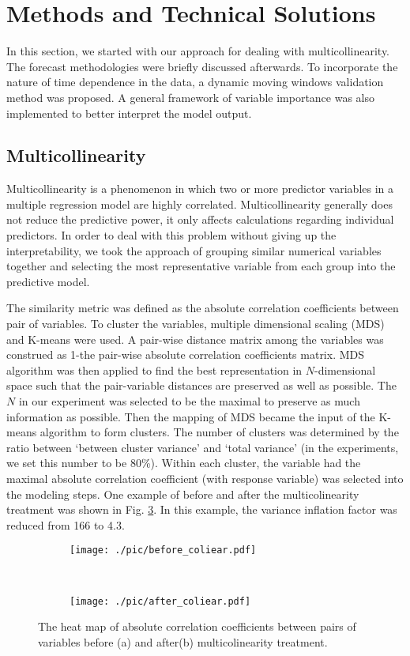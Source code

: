 \documentclass{llncs}
\begin{document}
\section{Methods and Technical Solutions}
\label{sec:method}
In this section, we started with our approach for dealing with multicollinearity. The forecast methodologies were briefly discussed afterwards. To incorporate the nature of time dependence in the data, a dynamic moving windows validation method was proposed. A general framework of variable importance was also implemented to better interpret the model output.

\subsection{Multicollinearity}
\label{sec:colinear}
Multicollinearity is a phenomenon in which two or more predictor variables in a multiple regression model are highly correlated. Multicollinearity generally does not reduce the predictive power, it only affects calculations regarding individual predictors. In order to deal with this problem without giving up the interpretability, we took the approach of grouping similar numerical variables together and selecting the most representative variable from each group into the predictive model.

The similarity metric was defined as the absolute correlation coefficients between pair of variables. To cluster the variables, multiple dimensional scaling (MDS) \cite{Kruskal1978} and K-means \cite{MacQueen1967} were used. A pair-wise distance matrix among the variables was construed as 1-the pair-wise absolute correlation coefficients matrix. MDS algorithm was then applied to find the best representation in $N$-dimensional space such that the pair-variable distances are preserved as well as possible. The $N$ in our experiment was selected to be the maximal to preserve as much information as possible. Then the mapping of MDS became the input of the K-means algorithm to form clusters. The number of clusters was determined by the ratio between  `between cluster variance' and  `total variance' (in the experiments, we set this number to be 80\%). Within each cluster, the variable had the maximal absolute correlation coefficient (with response variable) was selected into the modeling steps. One example of before and after the multicolinearity treatment was shown in Fig. \ref{fig:colinear}. In this example, the variance inflation factor was reduced from 166 to 4.3.

\begin{figure}[ht]
\begin{subfigure}{0.45\textwidth}
    \texttt{[image: ./pic/before\_coliear.pdf]}
    \caption{}
    \label{fig:before}
\end{subfigure}
~
\begin{subfigure}{0.45\textwidth}
    \texttt{[image: ./pic/after\_coliear.pdf]}
    \caption{}
    \label{fig:after}
\end{subfigure}
\caption{The heat map of absolute correlation coefficients between pairs of variables before (a) and after(b) multicolinearity treatment.}
    \label{fig:colinear}
\end{figure}
\end{document}
